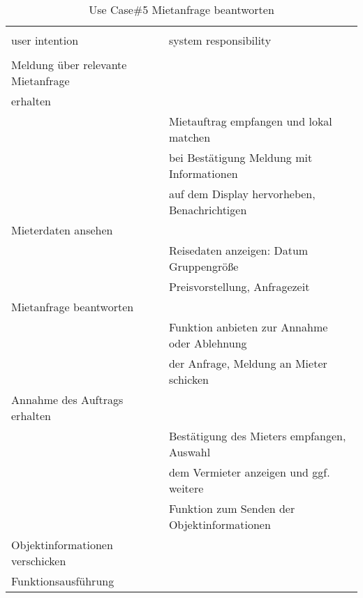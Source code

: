 \begin{table}[H]
\caption{Use Case\#5 Mietanfrage beantworten }
\centering
\begin{tabular}{l l}
\\ [-0.5ex]

\hline\hline
\\ [-0.5ex]
user intention & system responsibility
\\ [1.5ex]
\hline
\\ [-0.5ex]
Meldung über relevante Mietanfrage 	& 												\\[1ex]
erhalten 							& 												\\[1ex]
									& Mietauftrag empfangen und lokal matchen		\\[1ex]
									& bei Bestätigung Meldung mit Informationen		\\[1ex]
									& auf dem Display hervorheben, Benachrichtigen	\\[1ex]
Mieterdaten ansehen					& 											 	\\[1ex]
									& Reisedaten anzeigen: Datum Gruppengröße		\\[1ex]
									& Preisvorstellung, Anfragezeit					\\[1ex]
Mietanfrage beantworten  			& 												\\[1ex] 
									& Funktion anbieten zur Annahme oder Ablehnung 	\\[1ex]
									& der Anfrage, Meldung an Mieter schicken      	\\[1ex]
Annahme des Auftrags erhalten		& 											 	\\[1ex]
									& Bestätigung des Mieters empfangen, Auswahl	\\[1ex]
									& dem Vermieter anzeigen und ggf. weitere 		\\[1ex]
									& Funktion zum Senden der Objektinformationen	\\[1ex]
Objektinformationen verschicken		& 											 	\\[1ex]
Funktionsausführung					& 											 	\\[1ex]



\hline
\end{tabular}
\label{tab:mietanfrageUC}
\end{table}

